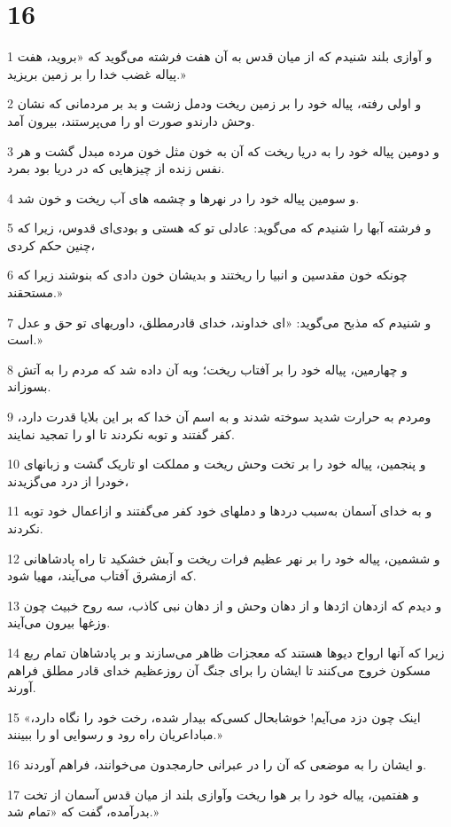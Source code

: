 \chapter{16}

\par 1 و آوازی بلند شنیدم که از میان قدس به آن هفت فرشته می‌گوید که «بروید، هفت پیاله غضب خدا را بر زمین بریزید.»
\par 2 و اولی رفته، پیاله خود را بر زمین ریخت ودمل زشت و بد بر مردمانی که نشان وحش دارندو صورت او را می‌پرستند، بیرون آمد.
\par 3 و دومین پیاله خود را به دریا ریخت که آن به خون مثل خون مرده مبدل گشت و هر نفس زنده از چیزهایی که در دریا بود بمرد.
\par 4 و سومین پیاله خود را در نهرها و چشمه های آب ریخت و خون شد.
\par 5 و فرشته آبها را شنیدم که می‌گوید: عادلی تو که هستی و بودی‌ای قدوس، زیرا که چنین حکم کردی،
\par 6 چونکه خون مقدسین و انبیا را ریختند و بدیشان خون دادی که بنوشند زیرا که مستحقند.»
\par 7 و شنیدم که مذبح می‌گوید: «ای خداوند، خدای قادرمطلق، داوریهای تو حق و عدل است.»
\par 8 و چهارمین، پیاله خود را بر آفتاب ریخت؛ وبه آن داده شد که مردم را به آتش بسوزاند.
\par 9 ومردم به حرارت شدید سوخته شدند و به اسم آن خدا که بر این بلایا قدرت دارد، کفر گفتند و توبه نکردند تا او را تمجید نمایند.
\par 10 و پنجمین، پیاله خود را بر تخت وحش ریخت و مملکت او تاریک گشت و زبانهای خودرا از درد می‌گزیدند،
\par 11 و به خدای آسمان به‌سبب دردها و دملهای خود کفر می‌گفتند و ازاعمال خود توبه نکردند.
\par 12 و ششمین، پیاله خود را بر نهر عظیم فرات ریخت و آبش خشکید تا راه پادشاهانی که ازمشرق آفتاب می‌آیند، مهیا شود.
\par 13 و دیدم که ازدهان اژدها و از دهان وحش و از دهان نبی کاذب، سه روح خبیث چون وزغها بیرون می‌آیند.
\par 14 زیرا که آنها ارواح دیوها هستند که معجزات ظاهر می‌سازند و بر پادشاهان تمام ربع مسکون خروج می‌کنند تا ایشان را برای جنگ آن روزعظیم خدای قادر مطلق فراهم آورند.
\par 15 «اینک چون دزد می‌آیم! خوشابحال کسی‌که بیدار شده، رخت خود را نگاه دارد، مباداعریان راه رود و رسوایی او را ببینند.»
\par 16 و ایشان را به موضعی که آن را در عبرانی حارمجدون می‌خوانند، فراهم آوردند.
\par 17 و هفتمین، پیاله خود را بر هوا ریخت وآوازی بلند از میان قدس آسمان از تخت بدرآمده، گفت که «تمام شد.»
